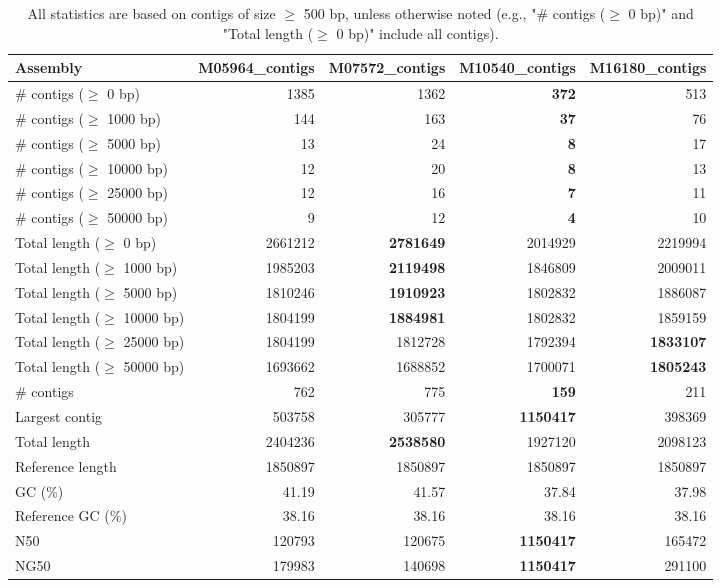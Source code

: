 \documentclass[12pt,a4paper]{article}
\begin{document}
\begin{table}[ht]
\begin{center}
\caption{All statistics are based on contigs of size $\geq$ 500 bp, unless otherwise noted (e.g., "\# contigs ($\geq$ 0 bp)" and "Total length ($\geq$ 0 bp)" include all contigs).}
\begin{tabular}{|l*{4}{|r}|}
\hline
Assembly & M05964\_contigs & M07572\_contigs & M10540\_contigs & M16180\_contigs \\ \hline
\# contigs ($\geq$ 0 bp) & 1385 & 1362 & {\bf 372} & 513 \\ \hline
\# contigs ($\geq$ 1000 bp) & 144 & 163 & {\bf 37} & 76 \\ \hline
\# contigs ($\geq$ 5000 bp) & 13 & 24 & {\bf 8} & 17 \\ \hline
\# contigs ($\geq$ 10000 bp) & 12 & 20 & {\bf 8} & 13 \\ \hline
\# contigs ($\geq$ 25000 bp) & 12 & 16 & {\bf 7} & 11 \\ \hline
\# contigs ($\geq$ 50000 bp) & 9 & 12 & {\bf 4} & 10 \\ \hline
Total length ($\geq$ 0 bp) & 2661212 & {\bf 2781649} & 2014929 & 2219994 \\ \hline
Total length ($\geq$ 1000 bp) & 1985203 & {\bf 2119498} & 1846809 & 2009011 \\ \hline
Total length ($\geq$ 5000 bp) & 1810246 & {\bf 1910923} & 1802832 & 1886087 \\ \hline
Total length ($\geq$ 10000 bp) & 1804199 & {\bf 1884981} & 1802832 & 1859159 \\ \hline
Total length ($\geq$ 25000 bp) & 1804199 & 1812728 & 1792394 & {\bf 1833107} \\ \hline
Total length ($\geq$ 50000 bp) & 1693662 & 1688852 & 1700071 & {\bf 1805243} \\ \hline
\# contigs & 762 & 775 & {\bf 159} & 211 \\ \hline
Largest contig & 503758 & 305777 & {\bf 1150417} & 398369 \\ \hline
Total length & 2404236 & {\bf 2538580} & 1927120 & 2098123 \\ \hline
Reference length & 1850897 & 1850897 & 1850897 & 1850897 \\ \hline
GC (\%) & 41.19 & 41.57 & 37.84 & 37.98 \\ \hline
Reference GC (\%) & 38.16 & 38.16 & 38.16 & 38.16 \\ \hline
N50 & 120793 & 120675 & {\bf 1150417} & 165472 \\ \hline
NG50 & 179983 & 140698 & {\bf 1150417} & 291100 \\ \hline

\end{tabular}
\end{center}
\end{table}
\end{document}
